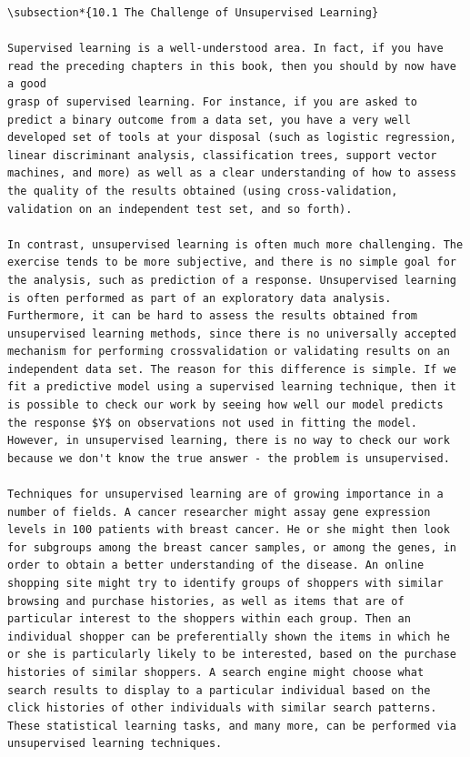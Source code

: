 \documentclass[10pt]{article}
\begin{document}
\begin{verbatim}
\subsection*{10.1 The Challenge of Unsupervised Learning}

Supervised learning is a well-understood area. In fact, if you have read the preceding chapters in this book, then you should by now have a good
grasp of supervised learning. For instance, if you are asked to predict a binary outcome from a data set, you have a very well developed set of tools at your disposal (such as logistic regression, linear discriminant analysis, classification trees, support vector machines, and more) as well as a clear understanding of how to assess the quality of the results obtained (using cross-validation, validation on an independent test set, and so forth).

In contrast, unsupervised learning is often much more challenging. The exercise tends to be more subjective, and there is no simple goal for the analysis, such as prediction of a response. Unsupervised learning is often performed as part of an exploratory data analysis. Furthermore, it can be hard to assess the results obtained from unsupervised learning methods, since there is no universally accepted mechanism for performing crossvalidation or validating results on an independent data set. The reason for this difference is simple. If we fit a predictive model using a supervised learning technique, then it is possible to check our work by seeing how well our model predicts the response $Y$ on observations not used in fitting the model. However, in unsupervised learning, there is no way to check our work because we don't know the true answer - the problem is unsupervised.

Techniques for unsupervised learning are of growing importance in a number of fields. A cancer researcher might assay gene expression levels in 100 patients with breast cancer. He or she might then look for subgroups among the breast cancer samples, or among the genes, in order to obtain a better understanding of the disease. An online shopping site might try to identify groups of shoppers with similar browsing and purchase histories, as well as items that are of particular interest to the shoppers within each group. Then an individual shopper can be preferentially shown the items in which he or she is particularly likely to be interested, based on the purchase histories of similar shoppers. A search engine might choose what search results to display to a particular individual based on the click histories of other individuals with similar search patterns. These statistical learning tasks, and many more, can be performed via unsupervised learning techniques.


\end{verbatim}
\end{document}
